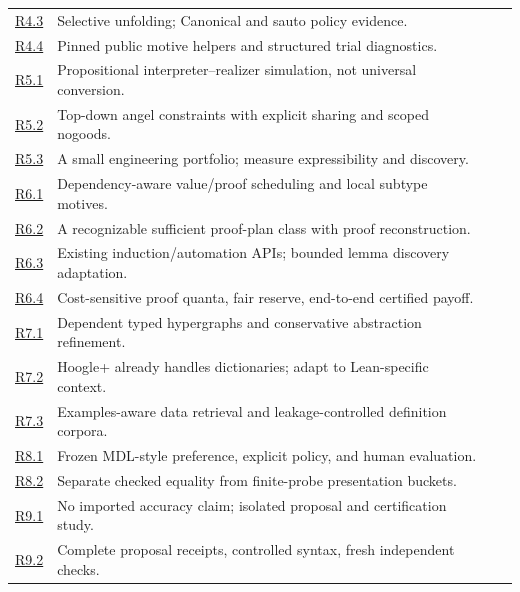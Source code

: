 \documentclass[11pt,a4paper]{article}
\newcommand{\qref}[1]{\hyperref[q:#1]{#1}}
\theoremstyle{definition}
\theoremstyle{remark}
\begin{document}
\begin{longtable}{@{}P{14mm}P{79mm}P{43mm}r@{}}
\qref{R4.3}&Selective unfolding; Canonical and sauto policy evidence.&&\pageref{q:R4.3}\\
\qref{R4.4}&Pinned public motive helpers and structured trial diagnostics.&&\pageref{q:R4.4}\\
\qref{R5.1}&Propositional interpreter--realizer simulation, not universal conversion.&&\pageref{q:R5.1}\\
\qref{R5.2}&Top-down angel constraints with explicit sharing and scoped nogoods.&&\pageref{q:R5.2}\\
\qref{R5.3}&A small engineering portfolio; measure expressibility and discovery.&&\pageref{q:R5.3}\\
\qref{R6.1}&Dependency-aware value/proof scheduling and local subtype motives.&&\pageref{q:R6.1}\\
\qref{R6.2}&A recognizable sufficient proof-plan class with proof reconstruction.&&\pageref{q:R6.2}\\
\qref{R6.3}&Existing induction/automation APIs; bounded lemma discovery adaptation.&&\pageref{q:R6.3}\\
\qref{R6.4}&Cost-sensitive proof quanta, fair reserve, end-to-end certified payoff.&&\pageref{q:R6.4}\\
\qref{R7.1}&Dependent typed hypergraphs and conservative abstraction refinement.&&\pageref{q:R7.1}\\
\qref{R7.2}&Hoogle+ already handles dictionaries; adapt to Lean-specific context.&&\pageref{q:R7.2}\\
\qref{R7.3}&Examples-aware data retrieval and leakage-controlled definition corpora.&&\pageref{q:R7.3}\\
\qref{R8.1}&Frozen MDL-style preference, explicit policy, and human evaluation.&&\pageref{q:R8.1}\\
\qref{R8.2}&Separate checked equality from finite-probe presentation buckets.&&\pageref{q:R8.2}\\
\qref{R9.1}&No imported accuracy claim; isolated proposal and certification study.&&\pageref{q:R9.1}\\
\qref{R9.2}&Complete proposal receipts, controlled syntax, fresh independent checks.&&\pageref{q:R9.2}\\
\bottomrule
\end{longtable}
\end{document}
